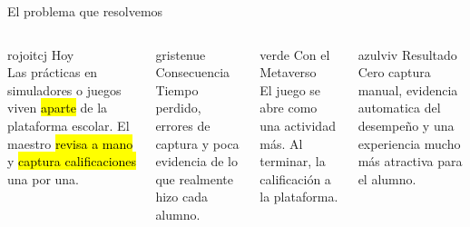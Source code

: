 \begin{frame}{El problema que resolvemos}
\vspace{0.2cm}
\begin{columns}[T]
\begin{tarjetabox}{rojoitcj}
{\demi\color{rojoitcj}Hoy}\\[2pt]
Las pr\'acticas en simuladores o juegos viven \hl{aparte} de la plataforma escolar.
El maestro \hl{revisa a mano} y \hl{captura calificaciones} una por una.
\end{tarjetabox}
\begin{tarjetabox}{gristenue}
{\demi\color{gristenue}Consecuencia}\\[2pt]
Tiempo perdido, errores de captura y poca evidencia de lo que realmente hizo cada alumno.
\end{tarjetabox}

\begin{tarjetabox}{verde}
{\demi\color{verde}Con el Metaverso}\\[2pt]
El juego se abre  como una actividad m\'as. Al terminar,
la calificaci\'on  a la plataforma.
\end{tarjetabox}
\begin{tarjetabox}{azulviv}
{\demi\color{azulviv}Resultado}\\[2pt]
Cero captura manual, evidencia automatica del desempe\~no y una experiencia
mucho m\'as atractiva para el alumno.
\end{tarjetabox}
\end{columns}
\end{frame}

